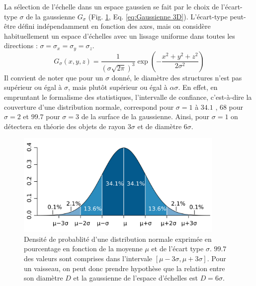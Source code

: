 La sélection de l'échelle dans un espace gaussien se fait par le choix de l'écart-type $\sigma$ de la gaussienne $G_\sigma$ (Fig. \ref{fig:normal_distribution_probability_coverage}, Eq. \ref{eq:Gaussienne 3D}). L'écart-type peut-être défini indépendamment en fonction des axes, mais on considère habituellement un espace d'échelles avec un lissage uniforme dans toutes les directions : $\sigma = \sigma_x = \sigma_y = \sigma_z$. 
\begin{equation}
  G_\sigma(x,y,z) = \frac{1}{ (\sigma\sqrt{2\pi})^3 }\exp(-\frac{x^2 + y^2 + z^2}{2\sigma^2 })
  \label{eq:Gaussienne 3D}
\end{equation}
Il convient de noter que pour un $\sigma$ donné, le diamètre des structures n'est pas supérieur ou égal à $\sigma$, mais plutôt supérieur ou égal à $\alpha\sigma$. En effet, en empruntant le formalisme des statistiques, l'intervalle de confiance, c'est-à-dire la couverture d'une distribution normale, correspond pour $\sigma=1$ à $34.1$ \percent{}, $68$ \percent{}pour $\sigma=2$ et $99.7$ \percent{}pour $\sigma=3$ de la surface de la gaussienne. Ainsi, pour $\sigma=1$ on détectera en théorie des objets de rayon $3\sigma$ et de diamètre $6\sigma$.  
\begin{figure}[!ht]
  \centering
  \includegraphics[height=5cm]{Images/normal_distribution_probability_coverage.png}
  \caption{Densité de probablité d'une distribution normale exprimée en pourcentage en fonction de la moyenne $\mu$ et de l'écart type $\sigma$. $99.7$ \percent{}des valeurs sont comprises dans l'intervale $[\mu-3\sigma,\mu+3\sigma]$. Pour un vaisseau, on peut donc prendre hypothèse que la relation entre son diamètre $D$ et la gaussienne de l'espace d'échelles est $D=6\sigma$.\protect\footnotemark}
  \label{fig:normal_distribution_probability_coverage}
\end{figure}

